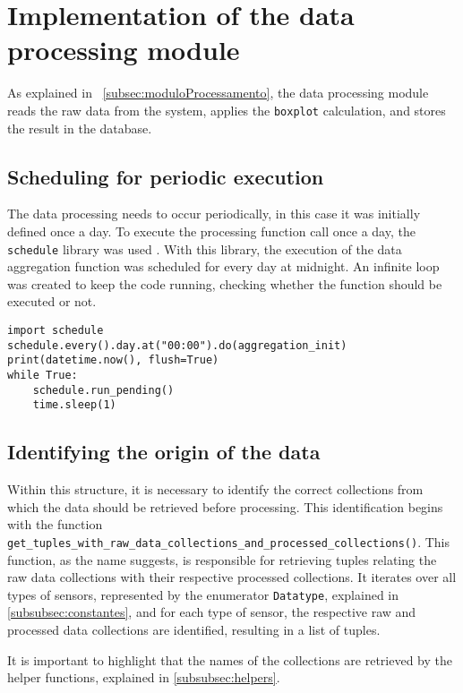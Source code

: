 \section[Implementation of the data processing module]{Implementation of the data processing module}\label{sec:ImplModuloProcessamento}

As explained in ~\ref{subsec:moduloProcessamento}, the data processing module reads the raw data from the system, applies the \texttt{boxplot} calculation, and stores the result in the database.

\subsection{Scheduling for periodic execution}
The data processing needs to occur periodically, in this case it was initially defined once a day. To execute the processing function call once a day, the \texttt{schedule} library was used \cite{scheduleDocs}. With this library, the execution of the data aggregation function was scheduled for every day at midnight. An infinite loop was created to keep the code running, checking whether the function should be executed or not.

\begin{verbatim}
import schedule
schedule.every().day.at("00:00").do(aggregation_init)
print(datetime.now(), flush=True)
while True:
    schedule.run_pending()
    time.sleep(1)
\end{verbatim}

\subsection{Identifying the origin of the data}
Within this structure, it is necessary to identify the correct collections from which the data should be retrieved before processing. This identification begins with the function \texttt{get\_tuples\_with\_raw\_data\_collections\_and\_processed\_collections()}. This function, as the name suggests, is responsible for retrieving tuples relating the raw data collections with their respective processed collections. It iterates over all types of sensors, represented by the enumerator \texttt{Datatype}, explained in \ref{subsubsec:constantes}, and for each type of sensor, the respective raw and processed data collections are identified, resulting in a list of tuples.

It is important to highlight that the names of the collections are retrieved by the helper functions, explained in \ref{subsubsec:helpers}.

